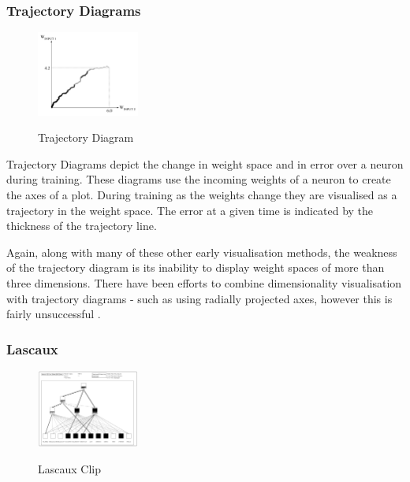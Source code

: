 \documentclass[a4paper,11pt,titlepage]{article}
\begin{document}
\subsubsection{Trajectory Diagrams}
		
 	\begin{figure}[H]
    			\centering	
			{{\includegraphics[width=0.3\textwidth]
    				{img/craven_trajectory.png} 
    			}}%
    			\caption{Trajectory Diagram}%
    		\label{fig:bond}
	\end{figure} 
 		
		Trajectory Diagrams \cite{Wejchert1990} depict the change in weight space and in error over a neuron during training. These diagrams use the incoming weights of a neuron to create the axes of a plot. During training as the weights change they are visualised as a trajectory in the weight space. The error at a given time is indicated by the thickness of the trajectory line.
		\par 	
		Again, along with many of these other early visualisation methods, the weakness of the trajectory diagram is its inability to display weight spaces of more than three dimensions. There have been efforts to combine dimensionality visualisation with trajectory diagrams - such as using radially projected axes, however this is fairly unsuccessful \cite{Craven1992}. 
		\par 
		
\subsubsection{Lascaux}
		
	\begin{figure}[H]
    			\centering	
			{{\includegraphics[width=0.3\textwidth]
    				{img/craven_weights.png} 
    			}}%
    			\caption{Lascaux Clip}%
    		\label{fig:lascaux}
	\end{figure}  		
 		
\end{document}
